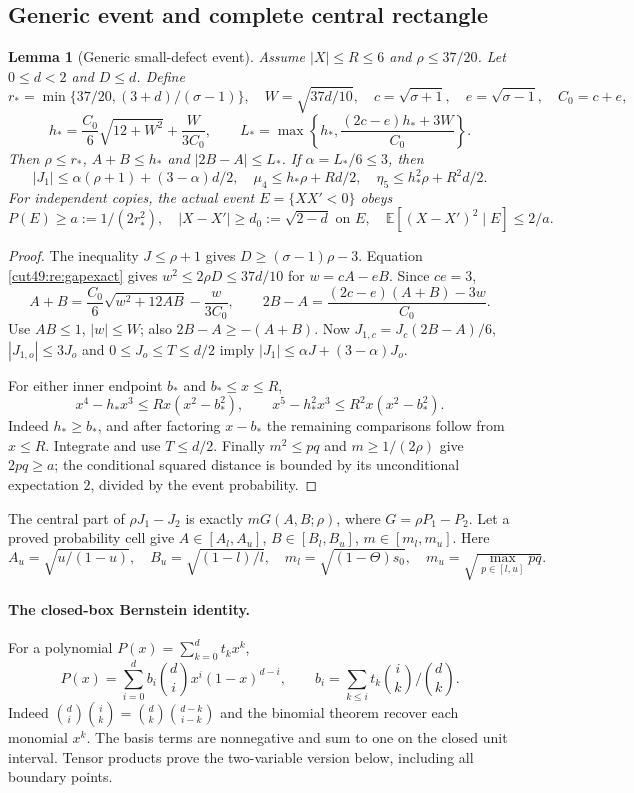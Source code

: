\documentclass[11pt,a4paper]{article}
\numberwithin{equation}{section}
\newtheorem{lemma}[theorem]{Lemma}
\theoremstyle{definition}
\theoremstyle{remark}
\newcommand{\E}{\mathbb E}
\begin{document}
\subsection{Generic event and complete central rectangle}
\begin{lemma}[Generic small-defect event]\label{cut49:entry201:event}\label{cut49:mom:third}
Assume $|X|\le R\le6$ and $\rho\le37/20$. Let $0\le d<2$ and $D\le d$. Define
\[
 r_*=\min\{37/20,(3+d)/(\sigma-1)\},\quad
 W=\sqrt{37d/10},\quad c=\sqrt{\sigma+1},\quad e=\sqrt{\sigma-1},\quad C_0=c+e,
\]
\[
 h_*=\frac{C_0}{6}\sqrt{12+W^2}+\frac{W}{3C_0},\qquad
 L_*=\max\left\{h_*,\frac{(2c-e)h_*+3W}{C_0}\right\}.
\]
Then $\rho\le r_*$, $A+B\le h_*$ and $|2B-A|\le L_*$.
If $\alpha=L_*/6\le3$, then
\[
 |J_1|\le\alpha(\rho+1)+(3-\alpha)d/2,\quad
 \mu_4\le h_*\rho+Rd/2,\quad
 \eta_5\le h_*^2\rho+R^2d/2.
\]
For independent copies, the actual event $E=\{XX'<0\}$ obeys
\[
 P(E)\ge a:=1/(2r_*^2),\quad
 |X-X'|\ge d_0:=\sqrt{2-d}\text{ on }E,\quad
 \E[(X-X')^2\mid E]\le2/a.
\]
\end{lemma}
\begin{proof}
The inequality $J\le\rho+1$ gives $D\ge(\sigma-1)\rho-3$.
Equation \eqref{cut49:re:gapexact} gives $w^2\le2\rho D\le37d/10$ for
$w=cA-eB$. Since $ce=3$,
\[
 A+B=\frac{C_0}{6}\sqrt{w^2+12AB}-\frac{w}{3C_0},
 \qquad 2B-A=\frac{(2c-e)(A+B)-3w}{C_0}.
\]
Use $AB\le1$, $|w|\le W$; also $2B-A\ge-(A+B)$.
Now $J_{1,c}=J_c(2B-A)/6$, $|J_{1,o}|\le3J_o$ and
$0\le J_o\le T\le d/2$ imply
$|J_1|\le\alpha J+(3-\alpha)J_o$.

For either inner endpoint $b_*$ and $b_*\le x\le R$,
\[
 x^4-h_*x^3\le R x(x^2-b_*^2),\qquad
 x^5-h_*^2x^3\le R^2x(x^2-b_*^2).
\]
Indeed $h_*\ge b_*$, and after factoring $x-b_*$ the remaining
comparisons follow from $x\le R$. Integrate and use $T\le d/2$.
Finally $m^2\le pq$ and $m\ge1/(2\rho)$ give $2pq\ge a$;
the conditional squared distance is bounded by its unconditional
expectation $2$, divided by the event probability.
\end{proof}

The central part of $\rho J_1-J_2$ is exactly
$mG(A,B;\rho)$, where $G=\rho P_1-P_2$.
Let a proved probability cell give
$A\in[A_l,A_u]$, $B\in[B_l,B_u]$, $m\in[m_l,m_u]$.
Here
\[
 A_u=\sqrt{u/(1-u)},\quad B_u=\sqrt{(1-l)/l},\quad
 m_l=\sqrt{(1-\Theta)s_0},\quad
 m_u=\sqrt{\max_{p\in[l,u]}pq}.
\]

\paragraph{The closed-box Bernstein identity.}\label{cut49:re:bernstein}
For a polynomial $P(x)=\sum_{k=0}^dt_kx^k$,
\[
 P(x)=\sum_{i=0}^d b_i\binom di x^i(1-x)^{d-i},\qquad
 b_i=\sum_{k\le i}t_k\binom ik/\binom dk.
\]
Indeed $\binom di\binom ik=\binom dk\binom{d-k}{i-k}$ and the
binomial theorem recover each monomial $x^k$. The basis terms are
nonnegative and sum to one on the closed unit interval. Tensor products
prove the two-variable version below, including all boundary points.
\end{document}
